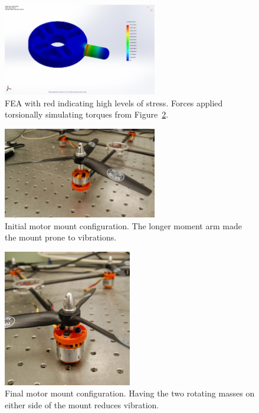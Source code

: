 \documentclass[12pt,letterpaper]{article} \usepackage[margin=1in]{geometry}
\begin{document}
\begin{figure}[!h]
	\centering
	\includegraphics[width=0.6\textwidth]{img/fea_strain.jpg}
	\caption{FEA with red indicating high levels of stress. Forces applied
	torsionally simulating torques from Figure~\ref{fig:mmi}.}
	\label{fig:feastrain}
\end{figure}

\begin{figure}[!h]
	\centering
	\includegraphics[width=0.6\textwidth]{img/motor_mount_initial.jpg}
	\caption{Initial motor mount configuration. The longer moment arm made the
	mount prone to vibrations.}
	\label{fig:mmi}
\end{figure}

\begin{figure}[!h]
	\centering
	\includegraphics[width=0.5\textwidth]{img/motor_mount_final.jpg}
	\caption{Final motor mount configuration. Having the two rotating masses on
	either side of the mount reduces vibration.}
	\label{fig:mmf}
\end{figure}
\end{document}
